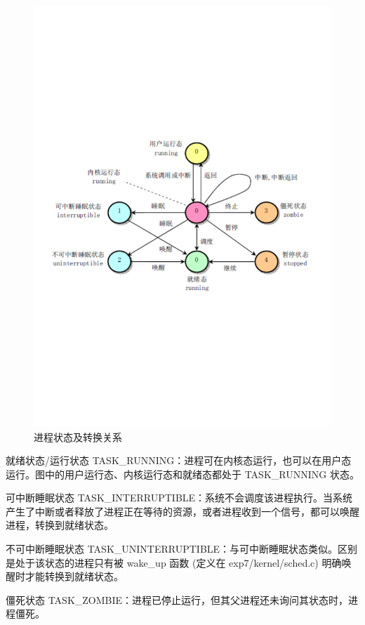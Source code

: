 \begin{figure}[htbp]
    \centering
    \includegraphics[width=\textwidth]{img/进程状态及转换关系.pdf}
    \caption{进程状态及转换关系}
    \label{fig:进程状态及转换关系}
\end{figure}

就绪状态/运行状态 TASK\_RUNNING：进程可在内核态运行，也可以在用户态运行。图中的用户运行态、内核运行态和就绪态都处于 TASK\_RUNNING 状态。

可中断睡眠状态 TASK\_INTERRUPTIBLE：系统不会调度该进程执行。当系统产生了中断或者释放了进程正在等待的资源，或者进程收到一个信号，都可以唤醒进程，转换到就绪状态。

不可中断睡眠状态 TASK\_UNINTERRUPTIBLE：与可中断睡眠状态类似。区别是处于该状态的进程只有被 wake\_up 函数 (定义在 exp7/kernel/sched.c) 明确唤醒时才能转换到就绪状态。

僵死状态 TASK\_ZOMBIE：进程已停止运行，但其父进程还未询问其状态时，进程僵死。

